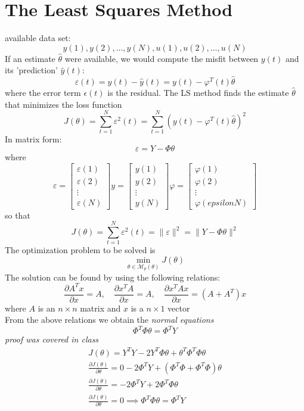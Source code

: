 \documentclass{book}
\begin{document}
\section{The Least Squares Method}
available data set:
\[
    y(1),y(2),\dots,y(N),u(1),u(2),\dots,u(N)
\]
If an estimate $\hat{\theta}$ were available, we would compute the misfit between $y(t)$ and its 'prediction' $\hat{y}(t)$:
\[
    \varepsilon(t)=y(t)-\hat{y}(t)=y(t)-\varphi^T(t)\hat{\theta}
\]
where the error term $\epsilon(t)$ is the residual. The LS method finds the estimate $\hat{\theta}$ that minimizes the loss function
\begin{equation}
    J(\theta)=\sum_{t=1}^N \varepsilon^2(t)=\sum_{t=1}^N (y(t)-\varphi^T(t)\hat{\theta})^2
\end{equation}
In matrix form:
\[
    \varepsilon=Y-\Phi \theta
\]
where
\[
    \varepsilon = \begin{bmatrix}
        \varepsilon(1) \\ \varepsilon(2) \\ \vdots \\ \varepsilon(N)
    \end{bmatrix}
    y= \begin{bmatrix}
       y(1) \\ y(2) \\ \vdots \\ y(N)
    \end{bmatrix}
    \varphi = \begin{bmatrix}
        \varphi (1) \\ \varphi(2) \\ \vdots \\ \varphi(epsilonN)
    \end{bmatrix}
\]
so that
\begin{equation}
    J(\theta)=\sum_{t=1}^N \varepsilon^2(t)=\|\varepsilon\|^2=\| Y-\Phi \theta \|^2
\end{equation}
The optimization problem to be solved is
\[
    \min_{\theta \in \mathcal{M}_p(\theta)}J(\theta)
\]
The solution can be found by using the following relations:
\[
    \frac{\partial A^Tx}{\partial x} =A, \quad \frac{\partial x^T A}{\partial x} = A, \quad \frac{\partial x^TAx}{\partial x} = (A+A^T)x
\]
where $A$ is an $n \times n$ matrix and $x$ is a $n \times 1$ vector\\
From the above relations we obtain the \emph{normal equations}
\[
    \Phi^T\Phi\theta=\Phi^TY
\]
\emph{proof was covered in class}\\
\begin{gather*}
    J(\theta)=Y^TY-2Y^T\Phi\theta+\theta^T\Phi^T\Phi\theta\\
    \frac{\partial J(\theta)}{\partial\theta}= 0 -2\Phi^TY+(\Phi^T\Phi + \Phi^T\Phi)\theta\\
    \frac{\partial J(\theta)}{\partial\theta}= -2\Phi^TY + 2\Phi^T\Phi \theta\\
    \frac{\partial J(\theta)}{\partial\theta}=0 \implies \Phi^T\Phi \theta =\Phi^TY
\end{gather*}
\end{document}
